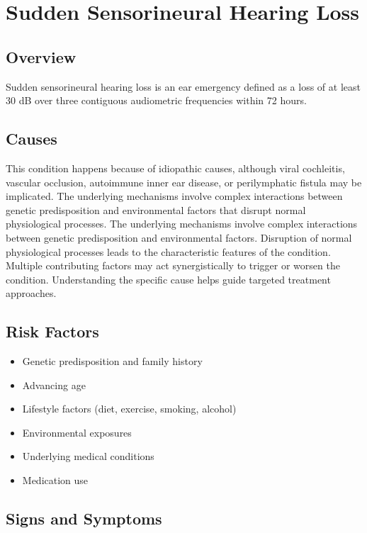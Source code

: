 \chapter{Sudden Sensorineural Hearing Loss}
\label{sec:Sudden Sensorineural Hearing Loss}

\section{Overview}
Sudden sensorineural hearing loss is an ear emergency defined as a loss of at least 30 dB over three contiguous audiometric frequencies within 72 hours.
\section{Causes}
This condition happens because of idiopathic causes, although viral cochleitis, vascular occlusion, autoimmune inner ear disease, or perilymphatic fistula may be implicated. The underlying mechanisms involve complex interactions between genetic predisposition and environmental factors that disrupt normal physiological processes. The underlying mechanisms involve complex interactions between genetic predisposition and environmental factors. Disruption of normal physiological processes leads to the characteristic features of the condition. Multiple contributing factors may act synergistically to trigger or worsen the condition. Understanding the specific cause helps guide targeted treatment approaches.
\section{Risk Factors}


\begin{itemize}[noitemsep]
  \item Genetic predisposition and family history
  \item Advancing age
  \item Lifestyle factors (diet, exercise, smoking, alcohol)
  \item Environmental exposures
  \item Underlying medical conditions
  \item Medication use
\end{itemize}
\section{Signs and Symptoms}

